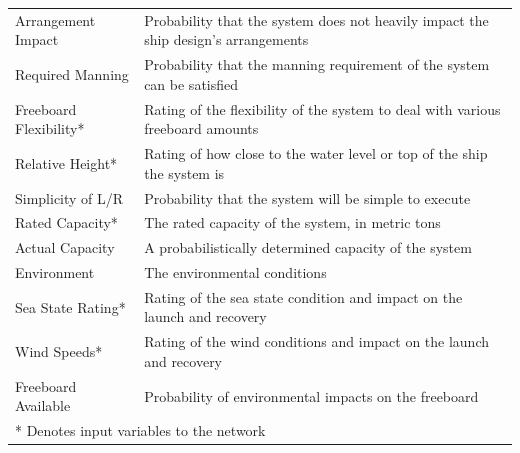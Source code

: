 \documentclass{svproc}
\begin{document}
\begin{table}[htb]
\begin{center}
\begin{tabular}{p{3.5cm}  p{8.7cm}}
Arrangement Impact            & Probability that the system does not heavily impact the ship design's arrangements \\
Required Manning              & Probability that the manning requirement of the system can be satisfied            \\
Freeboard \linebreak Flexibility*         & Rating of the flexibility of the system to deal with various freeboard amounts     \\
Relative Height*               & Rating of how close to the water level or top of the ship the system is            \\
Simplicity of L/R             & Probability that the system will be simple to execute                              \\
Rated Capacity*                & The rated capacity of the system, in metric tons                                   \\
Actual Capacity               & A probabilistically determined capacity of the system                              \\
\hline
Environment                   & The environmental conditions                                                       \\
Sea State Rating*              & Rating of the sea state condition and impact on the launch and recovery            \\
Wind Speeds*                   & Rating of the wind conditions and impact on the launch and recovery                \\
Freeboard Available           & Probability of environmental impacts on the freeboard      \\
\hline
\multicolumn{2}{l}{* Denotes input variables to the network}
\end{tabular}
\label{table:variables}
\end{center}
\end{table}
\end{document}
